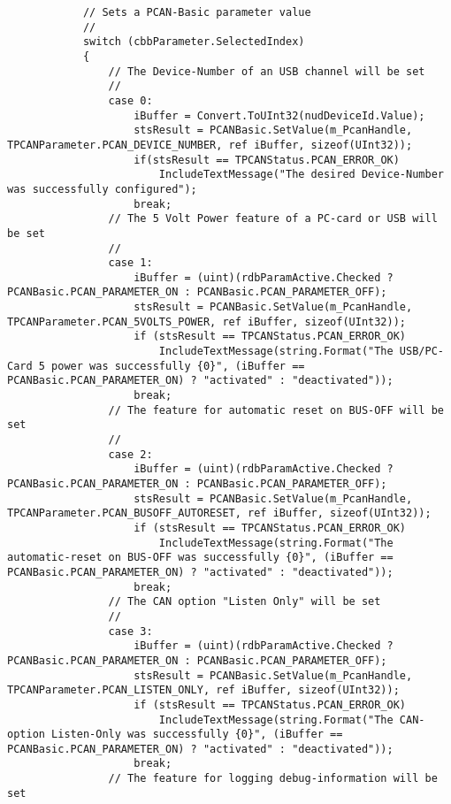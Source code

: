 \begin{lstlisting}
            // Sets a PCAN-Basic parameter value
            //
            switch (cbbParameter.SelectedIndex)
            {
                // The Device-Number of an USB channel will be set
                //
                case 0:
                    iBuffer = Convert.ToUInt32(nudDeviceId.Value);
                    stsResult = PCANBasic.SetValue(m_PcanHandle, TPCANParameter.PCAN_DEVICE_NUMBER, ref iBuffer, sizeof(UInt32));
                    if(stsResult == TPCANStatus.PCAN_ERROR_OK)
                        IncludeTextMessage("The desired Device-Number was successfully configured");
                    break;
                // The 5 Volt Power feature of a PC-card or USB will be set
                //
                case 1:
                    iBuffer = (uint)(rdbParamActive.Checked ? PCANBasic.PCAN_PARAMETER_ON : PCANBasic.PCAN_PARAMETER_OFF);
                    stsResult = PCANBasic.SetValue(m_PcanHandle, TPCANParameter.PCAN_5VOLTS_POWER, ref iBuffer, sizeof(UInt32));
                    if (stsResult == TPCANStatus.PCAN_ERROR_OK)
                        IncludeTextMessage(string.Format("The USB/PC-Card 5 power was successfully {0}", (iBuffer == PCANBasic.PCAN_PARAMETER_ON) ? "activated" : "deactivated"));
                    break;
                // The feature for automatic reset on BUS-OFF will be set
                //
                case 2:
                    iBuffer = (uint)(rdbParamActive.Checked ? PCANBasic.PCAN_PARAMETER_ON : PCANBasic.PCAN_PARAMETER_OFF);
                    stsResult = PCANBasic.SetValue(m_PcanHandle, TPCANParameter.PCAN_BUSOFF_AUTORESET, ref iBuffer, sizeof(UInt32));
                    if (stsResult == TPCANStatus.PCAN_ERROR_OK)
                        IncludeTextMessage(string.Format("The automatic-reset on BUS-OFF was successfully {0}", (iBuffer == PCANBasic.PCAN_PARAMETER_ON) ? "activated" : "deactivated"));
                    break;
                // The CAN option "Listen Only" will be set
                //
                case 3:
                    iBuffer = (uint)(rdbParamActive.Checked ? PCANBasic.PCAN_PARAMETER_ON : PCANBasic.PCAN_PARAMETER_OFF);
                    stsResult = PCANBasic.SetValue(m_PcanHandle, TPCANParameter.PCAN_LISTEN_ONLY, ref iBuffer, sizeof(UInt32));
                    if (stsResult == TPCANStatus.PCAN_ERROR_OK)
                        IncludeTextMessage(string.Format("The CAN-option Listen-Only was successfully {0}", (iBuffer == PCANBasic.PCAN_PARAMETER_ON) ? "activated" : "deactivated"));
                    break;
                // The feature for logging debug-information will be set

\end{lstlisting}
